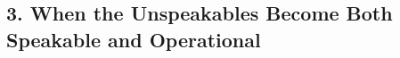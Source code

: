 \documentclass[11pt, a4paper]{article} %
\begin{document}

 
\subsection*{3. When the Unspeakables Become Both Speakable and Operational}
\end{document}
